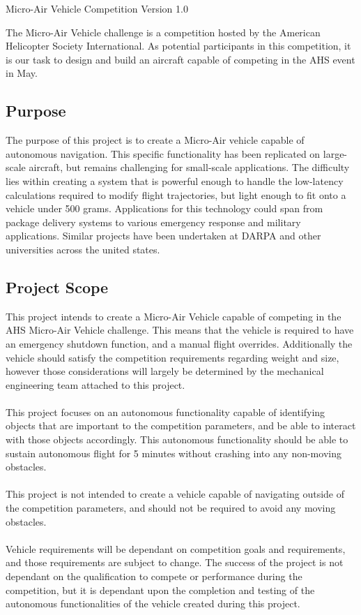 \documentclass[letterpaper, 10, draftclsnofoot, onecolumn]{IEEEtran}
\begin{document}
Micro-Air Vehicle Competition Version 1.0

The Micro-Air Vehicle challenge is a competition hosted by the American Helicopter Society International. As potential participants in this competition, it is our task to design and build an aircraft capable of competing in the AHS event in May.

\subsection{Purpose}

The purpose of this project is to create a Micro-Air vehicle capable of autonomous navigation. This specific functionality has been replicated on large-scale aircraft, but remains challenging for small-scale applications. The difficulty lies within creating a system that is powerful enough to handle the low-latency calculations required to modify flight trajectories, but light enough to fit onto a vehicle under 500 grams. Applications for this technology could span from package delivery systems to various emergency response and military applications. Similar projects have been undertaken at DARPA \cite{r1} and other universities across the united states.

\subsection{Project Scope}
This project intends to create a Micro-Air Vehicle capable of competing in the AHS Micro-Air Vehicle challenge.\cite{r2} This means that the vehicle is required to have an emergency shutdown function, and a manual flight overrides. Additionally the vehicle should satisfy the competition requirements regarding weight and size, however those considerations will largely be determined by the mechanical engineering team attached to this project.
 \\ \\
This project focuses on an autonomous functionality capable of identifying objects that are important to the competition parameters, and be able to interact with those objects accordingly. This autonomous functionality should be able to sustain autonomous flight for 5 minutes without crashing into any non-moving obstacles.
\\ \\
This project is not intended to create a vehicle capable of navigating outside of the competition parameters, and should not be required to avoid any moving obstacles.
\\ \\
Vehicle requirements will be dependant on competition goals and requirements, and those requirements are subject to change. The success of the project is not dependant on the qualification to compete or performance during the competition, but it is dependant upon the completion and testing of the autonomous functionalities of the vehicle created during this project.
\end{document}
